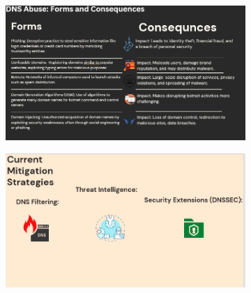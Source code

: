 \begin{figure}[H]
  \centering
  \begin{subfigure}[b]{0.55\textwidth}
    \includegraphics[width=\textwidth]{appendix/pre5.png}
    \label{fig:left}
  \end{subfigure}
  \hfill %
  \begin{subfigure}[b]{0.55\textwidth}
    \includegraphics[width=\textwidth]{appendix/pre6.png}
    \label{fig:right}
  \end{subfigure}
  \label{fig:images}
\end{figure}

